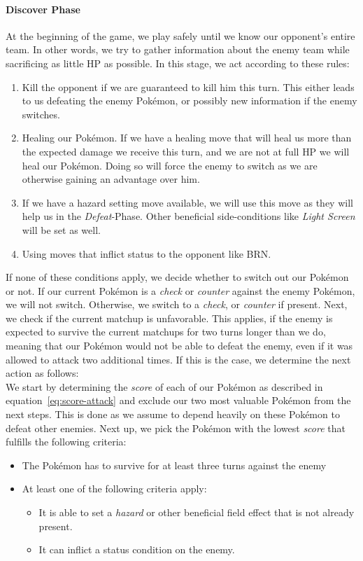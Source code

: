 \paragraph{Discover Phase}
At the beginning of the game, we play safely until we know our opponent's entire team. In other words, we try to gather 
information about the enemy team while sacrificing as little \ac{HP} as possible. In this stage, we act according to
these rules:
\begin{enumerate}
	\item Kill the opponent if we are guaranteed to kill him this turn. This either leads to us defeating the 
	enemy Pokémon, or possibly new information if the enemy switches.
	\item Healing our Pokémon. If we have a healing move that will heal us more than the expected damage we receive
	this turn, and we are not at full \ac{HP} we will heal our Pokémon. Doing so will force the enemy to switch as
	we are otherwise gaining an advantage over him.
	\item If we have a hazard setting move available, we will use this move as they will help us in the \textit{Defeat}-Phase.
	Other beneficial side-conditions like \textit{Light Screen} will be set as well. 
	\item Using moves that inflict status to the opponent like \ac{BRN}.
\end{enumerate}
If none of these conditions apply, we decide whether to switch out our Pokémon or not. If our current Pokémon is a 
\textit{check} or \textit{counter} against the enemy Pokémon, we will not switch. Otherwise, we switch to a \textit{check},
or \textit{counter} if present. Next, we check if the current matchup is unfavorable. This applies, if the enemy
is expected to survive the current matchups for two turns longer than we do, meaning that our Pokémon would not be able
to defeat the enemy, even if it was allowed to attack two additional times. If this is the case, we determine the next action
as follows: \\
We start by determining the \textit{score} of each of our Pokémon as described in equation~\ref{eq:score-attack} and exclude our
two most valuable Pokémon from the next steps. This is done as we assume to depend heavily on these Pokémon to defeat
other enemies. Next up, we pick the Pokémon with the lowest \textit{score} that fulfills the following 
criteria:
\begin{itemize}
	\item The Pokémon has to survive for at least three turns against the enemy
	\item At least one of the following criteria apply:
	\begin{itemize}
		\item It is able to set a \textit{hazard} or other beneficial field effect that is not already present.
		\item It can inflict a status condition on the enemy.
	\end{itemize}
\end{itemize}
